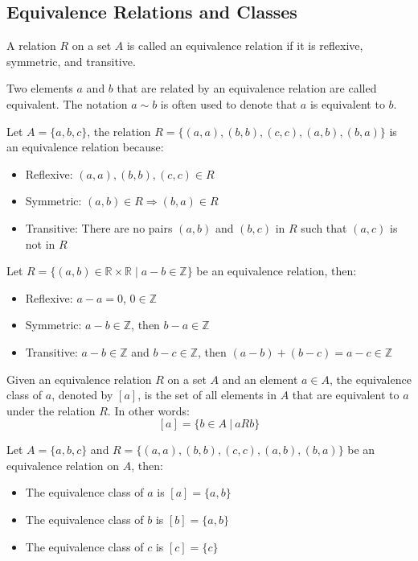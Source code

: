 \subsection{Equivalence Relations and Classes}
\begin{definition}
    A relation $R$ on a set $A$ is called an equivalence relation if it is reflexive, symmetric, and transitive.
\end{definition}
Two elements $a$ and $b$ that are related by an equivalence relation are called equivalent. The notation $a \sim b$ is often used to denote that $a$ is equivalent to $b$.
\begin{eg}
    Let $A = \{a,b,c\}$, the relation $R = \{(a,a), (b,b), (c,c), (a,b), (b,a)\}$ is an equivalence relation because:
    \begin{itemize}[itemsep=1pt,label=$\circ$]
        \item Reflexive: $(a,a), (b,b), (c,c) \in R$
        \item Symmetric: $(a,b) \in R \Rightarrow (b,a) \in R$
        \item Transitive: There are no pairs $(a,b)$ and $(b,c)$ in $R$ such that $(a,c)$ is not in $R$
    \end{itemize}
\end{eg}

\begin{eg}
    Let $R = \{(a,b) \in \mathbb{R} \times \mathbb{R} \mid a -b \in \mathbb{Z}\}$ be an equivalence relation, then:
    \begin{itemize}[itemsep=1pt,label=$\circ$]
        \item Reflexive: $a - a = 0$, $0 \in \mathbb{Z}$
        \item Symmetric: $a - b \in \mathbb{Z}$, then $b - a \in \mathbb{Z}$
        \item Transitive: $a - b \in \mathbb{Z}$ and $b - c \in \mathbb{Z}$, then $(a -b) + (b-c) = a - c \in \mathbb{Z}$
    \end{itemize}
\end{eg}

\begin{definition}
    Given an equivalence relation $R$ on a set $A$ and an element $a \in A$, the equivalence class of $a$, denoted by $[a]$, is the set of all elements in $A$ that are equivalent to $a$ under the relation $R$. In other words:
    \[ [a] = \{b \in A \ | \ a R b\} \]
\end{definition}
\begin{eg}
    Let $A = \{a,b,c\}$ and $R = \{(a,a), (b,b), (c,c), (a,b), (b,a)\}$ be an equivalence relation on $A$, then:
    \begin{itemize}[itemsep=1pt,label=$\circ$]
        \item The equivalence class of $a$ is $[a] = \{a,b\}$
        \item The equivalence class of $b$ is $[b] = \{a,b\}$
        \item The equivalence class of $c$ is $[c] = \{c\}$
    \end{itemize}
\end{eg}

